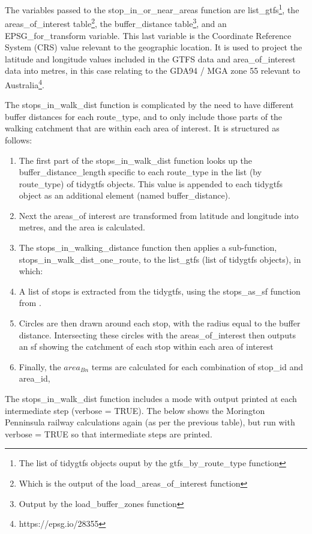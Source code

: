 \documentclass[preprint, 3p,
authoryear]{elsarticle} %
\begin{document}
The variables passed to the stop\_in\_or\_near\_areas function are
list\_gtfs\footnote{The list of tidygtfs objects ouput by the
  gtfs\_by\_route\_type function}, the areas\_of\_interest
table\footnote{Which is the output of the load\_areas\_of\_interest
  function}, the buffer\_distance table\footnote{Output by the
  load\_buffer\_zones function}, and an EPSG\_for\_transform variable.
This last variable is the Coordinate Reference System (CRS) value
relevant to the geographic location. It is used to project the latitude
and longitude values included in the GTFS data and area\_of\_interest
data into metres, in this case relating to the GDA94 / MGA zone 55
relevant to Australia\footnote{https://epsg.io/28355}.

The stops\_in\_walk\_dist function is complicated by the need to have
different buffer distances for each route\_type, and to only include
those parts of the walking catchment that are within each area of
interest. It is structured as follows:

\begin{enumerate}
\def\labelenumi{(\arabic{enumi})}
\item
  The first part of the stops\_in\_walk\_dist function looks up the
  buffer\_distance\_length specific to each route\_type in the list (by
  route\_type) of tidygtfs objects. This value is appended to each
  tidygtfs object as an additional element (named buffer\_distance).
\item
  Next the areas\_of interest are transformed from latitude and
  longitude into metres, and the area is calculated.
\item
  The stops\_in\_walking\_distance function then applies a sub-function,
  stops\_in\_walk\_dist\_one\_route, to the list\_gtfs (list of tidygtfs
  objects), in which:
\item
  A list of stops is extracted from the tidygtfs, using the
  stops\_as\_sf function from \citet{R-tidytransit}.
\item
  Circles are then drawn around each stop, with the radius equal to the
  buffer distance. Intersecting these circles with the
  areas\_of\_interest then outputs an sf showing the catchment of each
  stop within each area of interest
\item
  Finally, the \(area_{Bn}\) terms are calculated for each combination
  of stop\_id and area\_id,
\end{enumerate}

The stops\_in\_walk\_dist function includes a mode with output printed
at each intermediate step (verbose = TRUE). The below shows the
Morington Penninsula railway calculations again (as per the previous
table), but run with verbose = TRUE so that intermediate steps are
printed.
\end{document}
